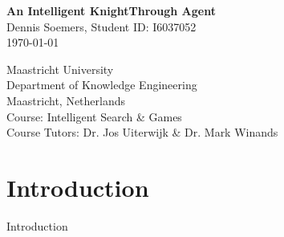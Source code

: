 \documentclass{article}
\begin{document}
\begin{titlepage}
\begin{center}
{\huge \bfseries An Intelligent KnightThrough Agent} \\
\vspace{1cm}
{\large Dennis Soemers, Student ID: I6037052}\\
\vspace{2cm}
{\large \today}\\
\vfill
\end{center}
\textrm{Maastricht University} \\
\textrm{Department of Knowledge Engineering} \\
\textrm{Maastricht, Netherlands} \\
\textrm{Course: Intelligent Search \& Games} \\
\textrm{Course Tutors: Dr. Jos Uiterwijk \& Dr. Mark Winands}

\end{titlepage}

\section{Introduction} 
Introduction



\end{document}
